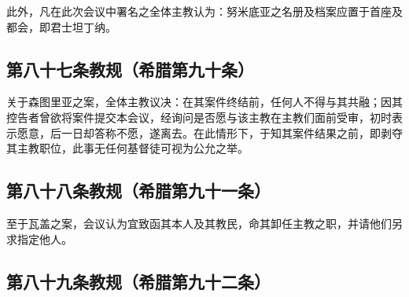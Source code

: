 \par

此外，凡在此次会议中署名之全体主教认为：努米底亚之名册及档案应置于首座及都会，即君士坦丁纳。\par

\par

\par


\subsection{第八十七条教规（希腊第九十条）}

\par

关于森图里亚之案，全体主教议决：在其案件终结前，任何人不得与其共融；因其控告者曾欲将案件提交本会议，经询问是否愿与该主教在主教们面前受审，初时表示愿意，后一日却答称不愿，遂离去。在此情形下，于知其案件结果之前，即剥夺其主教职位，此事无任何基督徒可视为公允之举。\par


\subsection{第八十八条教规（希腊第九十一条）}

\par

至于瓦盖之案，会议认为宜致函其本人及其教民，命其卸任主教之职，并请他们另求指定他人。\par


\subsection{第八十九条教规（希腊第九十二条）}

